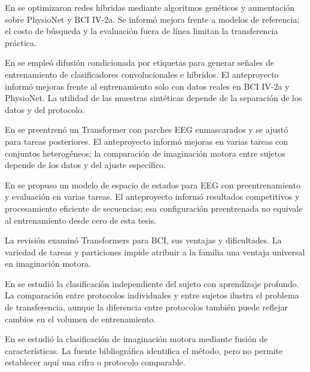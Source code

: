 En \cite{pfeffer2025evolving} se optimizaron redes híbridas mediante algoritmos genéticos y aumentación sobre PhysioNet y BCI IV-2a. Se informó mejora frente a modelos de referencia; el costo de búsqueda y la evaluación fuera de línea limitan la transferencia práctica.

En \cite{wang2026diffuser} se empleó difusión condicionada por etiquetas para generar señales de entrenamiento de clasificadores convolucionales e híbridos. El anteproyecto informó mejoras frente al entrenamiento solo con datos reales en BCI IV-2a y PhysioNet. La utilidad de las muestras sintéticas depende de la separación de los datos y del protocolo.

En \cite{jiang2024labram} se preentrenó un Transformer con parches EEG enmascarados y se ajustó para tareas posteriores. El anteproyecto informó mejoras en varias tareas con conjuntos heterogéneos; la comparación de imaginación motora entre sujetos depende de los datos y del ajuste específico.

En \cite{wang2025eegmamba} se propuso un modelo de espacio de estados para EEG con preentrenamiento y evaluación en varias tareas. El anteproyecto informó resultados competitivos y procesamiento eficiente de secuencias; esa configuración preentrenada no equivale al entrenamiento desde cero de esta tesis.

La revisión \cite{abibullaev2023review} examinó Transformers para BCI, sus ventajas y dificultades. La variedad de tareas y particiones impide atribuir a la familia una ventaja universal en imaginación motora.

En \cite{kwon2020} se estudió la clasificación independiente del sujeto con aprendizaje profundo. La comparación entre protocolos individuales y entre sujetos ilustra el problema de transferencia, aunque la diferencia entre protocolos también puede reflejar cambios en el volumen de entrenamiento.

En \cite{zhu2025hafusenet} se estudió la clasificación de imaginación motora mediante fusión de características. La fuente bibliográfica identifica el método, pero no permite establecer aquí una cifra o protocolo comparable.

